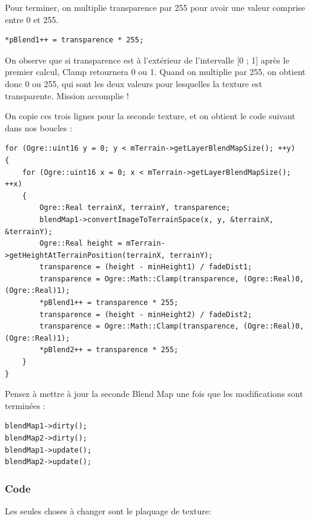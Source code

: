 Pour terminer, on multiplie transparence par 255 pour avoir une valeur comprise entre 0 et 255.

\begin{lstlisting}[caption={}]
*pBlend1++ = transparence * 255;
\end{lstlisting}

On observe que si transparence est \`a l'ext\'erieur de l'intervalle [0 ; 1] apr\`es le premier calcul, Clamp retournera 0 ou 1. Quand on multiplie par 255, on obtient donc 0 ou 255, qui sont les deux valeurs pour lesquelles la texture est transparente. Mission accomplie !

On copie ces trois lignes pour la seconde texture, et on obtient le code suivant dans nos boucles :

\begin{lstlisting}[caption={}]
for (Ogre::uint16 y = 0; y < mTerrain->getLayerBlendMapSize(); ++y)
{
    for (Ogre::uint16 x = 0; x < mTerrain->getLayerBlendMapSize(); ++x)
    {
        Ogre::Real terrainX, terrainY, transparence;
        blendMap1->convertImageToTerrainSpace(x, y, &terrainX, &terrainY);
        Ogre::Real height = mTerrain->getHeightAtTerrainPosition(terrainX, terrainY);
        transparence = (height - minHeight1) / fadeDist1;
        transparence = Ogre::Math::Clamp(transparence, (Ogre::Real)0, (Ogre::Real)1);
        *pBlend1++ = transparence * 255;
        transparence = (height - minHeight2) / fadeDist2;
        transparence = Ogre::Math::Clamp(transparence, (Ogre::Real)0, (Ogre::Real)1);
        *pBlend2++ = transparence * 255;
    }
}
\end{lstlisting}

Pensez \`a mettre \`a jour la seconde Blend Map une fois que les modifications sont termin\'ees :

\begin{lstlisting}[caption={}]
blendMap1->dirty();
blendMap2->dirty();
blendMap1->update();
blendMap2->update();
\end{lstlisting}




\subsubsection{Code}
Les seules choses \`a changer sont le plaquage de texture:


